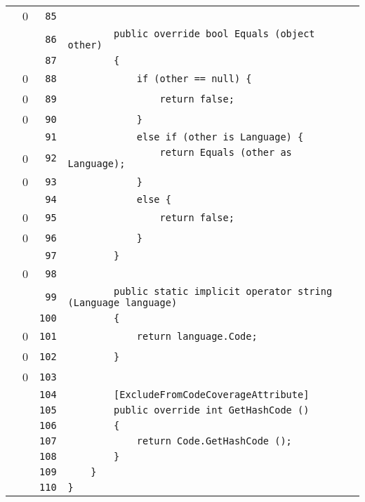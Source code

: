 \documentclass[a4paper,10pt]{article}
\begin{document}
\begin{longtable}[l]{lrrl}
\cellcolor{red} & 0 & \verb~85~ & \verb~~\\
\cellcolor{gray} &  & \verb~86~ & \verb~        public override bool Equals (object other)~\\
\cellcolor{gray} &  & \verb~87~ & \verb~        {~\\
\cellcolor{red} & 0 & \verb~88~ & \verb~            if (other == null) {~\\
\cellcolor{red} & 0 & \verb~89~ & \verb~                return false;~\\
\cellcolor{red} & 0 & \verb~90~ & \verb~            }~\\
\cellcolor{gray} &  & \verb~91~ & \verb~            else if (other is Language) {~\\
\cellcolor{red} & 0 & \verb~92~ & \verb~                return Equals (other as Language);~\\
\cellcolor{red} & 0 & \verb~93~ & \verb~            }~\\
\cellcolor{gray} &  & \verb~94~ & \verb~            else {~\\
\cellcolor{red} & 0 & \verb~95~ & \verb~                return false;~\\
\cellcolor{red} & 0 & \verb~96~ & \verb~            }~\\
\cellcolor{gray} &  & \verb~97~ & \verb~        }~\\
\cellcolor{red} & 0 & \verb~98~ & \verb~~\\
\cellcolor{gray} &  & \verb~99~ & \verb~        public static implicit operator string (Language language)~\\
\cellcolor{gray} &  & \verb~100~ & \verb~        {~\\
\cellcolor{red} & 0 & \verb~101~ & \verb~            return language.Code;~\\
\cellcolor{red} & 0 & \verb~102~ & \verb~        }~\\
\cellcolor{red} & 0 & \verb~103~ & \verb~~\\
\cellcolor{gray} &  & \verb~104~ & \verb~        [ExcludeFromCodeCoverageAttribute]~\\
\cellcolor{gray} &  & \verb~105~ & \verb~        public override int GetHashCode ()~\\
\cellcolor{gray} &  & \verb~106~ & \verb~        {~\\
\cellcolor{gray} &  & \verb~107~ & \verb~            return Code.GetHashCode ();~\\
\cellcolor{gray} &  & \verb~108~ & \verb~        }~\\
\cellcolor{gray} &  & \verb~109~ & \verb~    }~\\
\cellcolor{gray} &  & \verb~110~ & \verb~}~\\
\end{longtable}
\newpage
\end{document}
